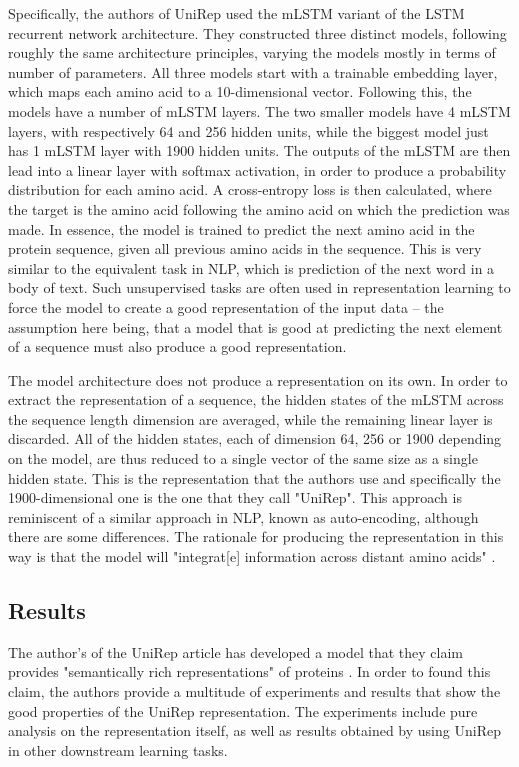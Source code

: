 \documentclass[a4paper,12pt]{article}
\begin{document}
Specifically, the authors of UniRep used the mLSTM variant of the LSTM recurrent network architecture. They constructed three distinct models, following roughly the same architecture principles, varying the models mostly in terms of number of parameters. All three models start with a trainable embedding layer, which maps each amino acid to a 10-dimensional vector. Following this, the models have a number of mLSTM layers. The two smaller models have 4 mLSTM layers, with respectively 64 and 256 hidden units, while the biggest model just has 1 mLSTM layer with 1900 hidden units. The outputs of the mLSTM are then lead into a linear layer with softmax activation, in order to produce a probability distribution for each amino acid. A cross-entropy loss is then calculated, where the target is the amino acid following the amino acid on which the prediction was made. In essence, the model is trained to predict the next amino acid in the protein sequence, given all previous amino acids in the sequence. This is very similar to the equivalent task in NLP, which is prediction of the next word in a body of text. Such unsupervised tasks are often used in representation learning to force the model to create a good representation of the input data -- the assumption here being, that a model that is good at predicting the next element of a sequence must also produce a good representation.

The model architecture does not produce a representation on its own. In order to extract the representation of a sequence, the hidden states of the mLSTM across the sequence length dimension are averaged, while the remaining linear layer is discarded. All of the hidden states, each of dimension 64, 256 or 1900 depending on the model, are thus reduced to a single vector of the same size as a single hidden state. This is the representation that the authors use and specifically the 1900-dimensional one is the one that they call "UniRep". This approach is reminiscent of a similar approach in NLP, known as auto-encoding, although there are some differences. The rationale for producing the representation in this way is that the model will "integrat[e] information across distant amino acids" \cite[p. 9]{alley2019unified}.

\subsection{Results}
The author's of the UniRep article has developed a model that they claim provides "semantically rich representations" of proteins \cite[p. 1]{alley2019unified}. In order to found this claim, the authors provide a multitude of experiments and results that show the good properties of the UniRep representation. The experiments include pure analysis on the representation itself, as well as results obtained by using UniRep in other downstream learning tasks.
\end{document}
